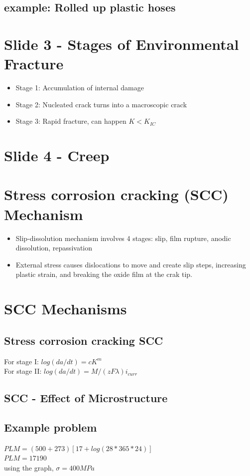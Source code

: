 \documentclass[11pt]{article}
\begin{document}
\subsection{example: Rolled up plastic hoses}
\section{Slide 3 - Stages of Environmental Fracture}
\begin{itemize}
    \item Stage 1: Accumulation of internal damage
    \item Stage 2: Nucleated crack turns into a macroscopic crack
    \item Stage 3: Rapid fracture, can happen $K<K_{IC}$
\end{itemize}
\section{Slide 4 - Creep}
\section{Stress corrosion cracking (SCC) Mechanism}
\begin{itemize}
    \item Slip-dissolution mechanism involves 4 stages: slip, film rupture, anodic dissolution, repassivation
    \item External stress causes dislocations to move and create slip steps, increasing plastic strain, and breaking the oxide film at the crak tip.
\end{itemize}
\section{SCC Mechanisms}
\subsection{Stress corrosion cracking SCC}
For stage I: $log(da/dt) = cK^m$\\
For stage II: $log(da/dt) = M/(zF\lambda)i_{curr}$
\subsection{SCC - Effect of Microstructure}
\subsection{Example problem}
$PLM = (500+273)[17 + log(28*365*24)]$
\\$PLM = 17190$\\
using the graph, $\sigma = 400 MPa$ 
\end{document}
